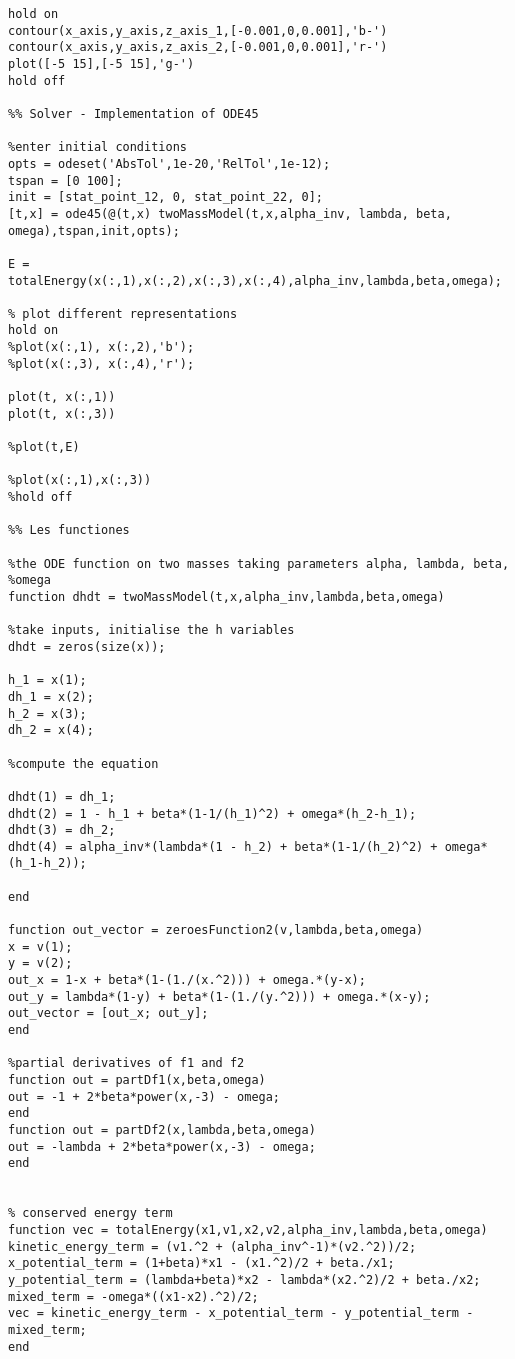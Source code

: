 \documentclass{report}
\begin{document}
\begin{verbatim}
hold on
contour(x_axis,y_axis,z_axis_1,[-0.001,0,0.001],'b-')
contour(x_axis,y_axis,z_axis_2,[-0.001,0,0.001],'r-')
plot([-5 15],[-5 15],'g-')
hold off

%% Solver - Implementation of ODE45

%enter initial conditions
opts = odeset('AbsTol',1e-20,'RelTol',1e-12);
tspan = [0 100];
init = [stat_point_12, 0, stat_point_22, 0];
[t,x] = ode45(@(t,x) twoMassModel(t,x,alpha_inv, lambda, beta, omega),tspan,init,opts);

E = totalEnergy(x(:,1),x(:,2),x(:,3),x(:,4),alpha_inv,lambda,beta,omega);

% plot different representations
hold on
%plot(x(:,1), x(:,2),'b');
%plot(x(:,3), x(:,4),'r');

plot(t, x(:,1))
plot(t, x(:,3))

%plot(t,E)

%plot(x(:,1),x(:,3))
%hold off

%% Les functiones

%the ODE function on two masses taking parameters alpha, lambda, beta,
%omega
function dhdt = twoMassModel(t,x,alpha_inv,lambda,beta,omega)

%take inputs, initialise the h variables
dhdt = zeros(size(x));

h_1 = x(1);
dh_1 = x(2);
h_2 = x(3);
dh_2 = x(4);

%compute the equation

dhdt(1) = dh_1;
dhdt(2) = 1 - h_1 + beta*(1-1/(h_1)^2) + omega*(h_2-h_1);
dhdt(3) = dh_2;
dhdt(4) = alpha_inv*(lambda*(1 - h_2) + beta*(1-1/(h_2)^2) + omega*(h_1-h_2));

end

function out_vector = zeroesFunction2(v,lambda,beta,omega)
x = v(1);
y = v(2);
out_x = 1-x + beta*(1-(1./(x.^2))) + omega.*(y-x);
out_y = lambda*(1-y) + beta*(1-(1./(y.^2))) + omega.*(x-y);
out_vector = [out_x; out_y];
end

%partial derivatives of f1 and f2
function out = partDf1(x,beta,omega)
out = -1 + 2*beta*power(x,-3) - omega;
end
function out = partDf2(x,lambda,beta,omega)
out = -lambda + 2*beta*power(x,-3) - omega;
end


% conserved energy term
function vec = totalEnergy(x1,v1,x2,v2,alpha_inv,lambda,beta,omega)
kinetic_energy_term = (v1.^2 + (alpha_inv^-1)*(v2.^2))/2;
x_potential_term = (1+beta)*x1 - (x1.^2)/2 + beta./x1;
y_potential_term = (lambda+beta)*x2 - lambda*(x2.^2)/2 + beta./x2;
mixed_term = -omega*((x1-x2).^2)/2;
vec = kinetic_energy_term - x_potential_term - y_potential_term - mixed_term;
end



\end{verbatim}
\end{document}

